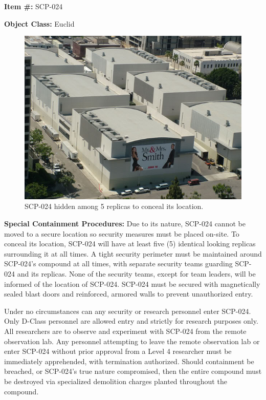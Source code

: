 
\textbf{Item \#:} SCP-024

\textbf{Object Class:} Euclid

\begin{figure}[h]
\begin{center}
\includegraphics[scale=0.4]{scp/024.jpg}
\linebreak SCP-024 hidden among 5 replicas to conceal its location.
\end{center}
\end{figure}

\textbf{Special Containment Procedures:} Due to its nature, SCP-024 cannot be moved to a secure location so security measures must be placed on-site. To conceal its location, SCP-024 will have at least five (5) identical looking replicas surrounding it at all times. A tight security perimeter must be maintained around SCP-024's compound at all times, with separate security teams guarding SCP-024 and its replicas. None of the security teams, except for team leaders, will be informed of the location of SCP-024. SCP-024 must be secured with magnetically sealed blast doors and reinforced, armored walls to prevent unauthorized entry.

Under no circumstances can any security or research personnel enter SCP-024. Only D-Class personnel are allowed entry and strictly for research purposes only. All researchers are to observe and experiment with SCP-024 from the remote observation lab. Any personnel attempting to leave the remote observation lab or enter SCP-024 without prior approval from a Level 4 researcher must be immediately apprehended, with termination authorized.
\newpage
Should containment be breached, or SCP-024's true nature compromised, then the entire compound must be destroyed via specialized demolition charges planted throughout the compound.


